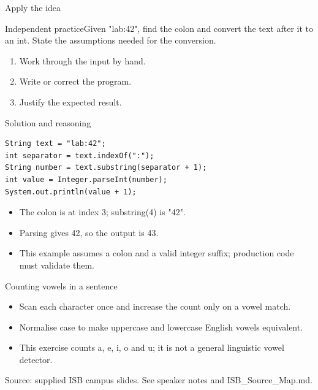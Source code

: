 \documentclass[10pt,aspectratio=169]{beamer}
\begin{document}
\begin{frame}[fragile,t]{Apply the idea}
\begin{alertblock}{Independent practice}Given "lab:42", find the colon and convert the text after it to an int. State the assumptions needed for the conversion.\end{alertblock}\vspace{3mm}\begin{enumerate}\item Work through the input by hand.\item Write or correct the program.\item Justify the expected result.\end{enumerate}
\end{frame}

\begin{frame}[fragile,t]{Solution and reasoning}
\begin{lstlisting}
String text = "lab:42";
int separator = text.indexOf(":");
String number = text.substring(separator + 1);
int value = Integer.parseInt(number);
System.out.println(value + 1);
\end{lstlisting}\vspace{1mm}\small\begin{itemize}
\item The colon is at index 3; substring(4) is "42".
\item Parsing gives 42, so the output is 43.
\item This example assumes a colon and a valid integer suffix; production code must validate them.
\end{itemize}
\end{frame}

\begin{frame}[fragile,t]{Counting vowels in a sentence}
\begin{itemize}
\item Scan each character once and increase the count only on a vowel match.
\item Normalise case to make uppercase and lowercase English vowels equivalent.
\item This exercise counts a, e, i, o and u; it is not a general linguistic vowel detector.
\end{itemize}
\vspace{3mm}\footnotesize\textcolor{accent}{Source: supplied ISB campus slides. See speaker notes and ISB\_Source\_Map.md.}
\end{frame}
\end{document}
